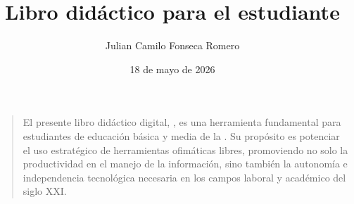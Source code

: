 \documentclass[letterpaper,10pt,spanish]{sphinxmanual}
\title{Libro didáctico para el estudiante}
\date{18 de mayo de 2026}
\author{Julian Camilo Fonseca Romero}
\begin{document}
\pagestyle{empty}
\sphinxmaketitle
\pagestyle{plain}
\sphinxtableofcontents
\pagestyle{normal}
\label{\detokenize{index::doc}}


\sphinxAtStartPar
{}
\begin{quote}

\sphinxAtStartPar
El presente libro didáctico digital, , es una herramienta fundamental para estudiantes de educación básica y media de la . Su propósito es potenciar el uso estratégico de herramientas ofimáticas libres, promoviendo no solo la productividad en el manejo de la información, sino también la autonomía e independencia tecnológica necesaria en los campos laboral y académico del siglo XXI.
\end{quote}
\end{document}
